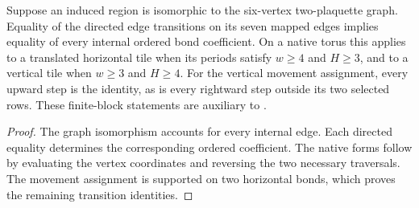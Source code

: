 \begin{lemma}
    \label{thm:peps_two_plaquette_transport_table}
    \leanok
    Suppose an induced region is isomorphic to the six-vertex two-plaquette
    graph. Equality of the directed edge transitions on its seven mapped edges
    implies equality of every internal ordered bond coefficient. On a native
    torus this applies to a translated horizontal tile when its periods satisfy
    $w\ge4$ and $H\ge3$, and to a vertical tile when $w\ge3$ and $H\ge4$.
    For the vertical movement assignment, every upward step is the
    identity, as is every rightward step outside its two selected rows.
    These finite-block statements are auxiliary to
    \cite[Theorem~6.16]{Schuch2010PEPS}.
\end{lemma}
\begin{proof}
    \leanok
    The graph isomorphism accounts for every internal edge. Each directed
    equality determines the corresponding ordered coefficient. The native
    forms follow by evaluating the vertex coordinates and reversing the two
    necessary traversals. The movement assignment is supported on two
    horizontal bonds, which proves the remaining transition identities.
\end{proof}
